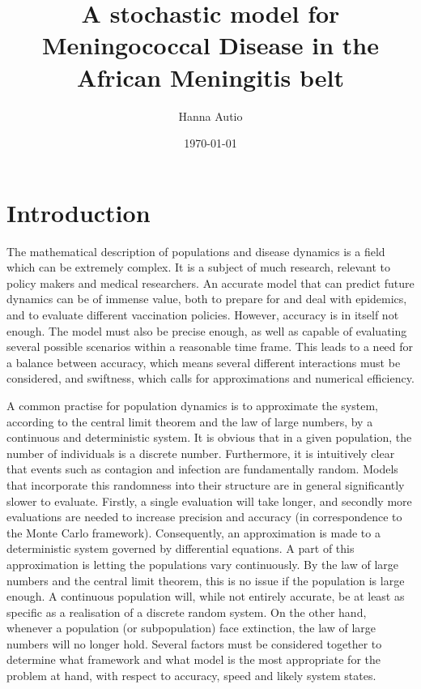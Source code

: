 \documentclass[10pt,a4paper]{article}
\author{Hanna Autio}
\title{A stochastic model for Meningococcal Disease in the African Meningitis belt} %
\date{\today}
\begin{document}
\maketitle
\thispagestyle{empty}
\cleardoublepage
\newpage
\setcounter{page}{1}



\section{Introduction}

The mathematical description of populations and disease dynamics is a field which can be extremely complex. It is a subject of much research, relevant to policy makers and medical researchers. An accurate model that can predict future dynamics can be of immense value, both to prepare for and deal with epidemics, and to evaluate different vaccination policies. However, accuracy is in itself not enough. The model must also be precise enough, as well as capable of evaluating several possible scenarios within a reasonable time frame. This leads to a need for a balance between accuracy, which means several different interactions must be considered, and swiftness, which calls for approximations and numerical efficiency.

A common practise for population dynamics is to approximate the system, according to the central limit theorem and the law of large numbers, by a continuous and deterministic system. It is obvious that in a given population, the number of individuals is a discrete number. Furthermore, it is intuitively clear that events such as contagion and infection are fundamentally random. Models that incorporate this randomness into their structure are in general significantly slower to evaluate. Firstly, a single evaluation will take longer, and secondly more evaluations are needed to increase precision and accuracy (in correspondence to the Monte Carlo framework). Consequently, an approximation is made to a deterministic system governed by differential equations. A part of this approximation is letting the populations vary continuously. By the law of large numbers and the central limit theorem, this is no issue if the population is large enough. A continuous population will, while not entirely accurate, be at least as specific as a realisation of a discrete random system. On the other hand, whenever a population (or subpopulation) face extinction, the law of large numbers will no longer hold. Several factors must be considered together to determine what framework and what model is the most appropriate for the problem at hand, with respect to accuracy, speed and likely system states.
\end{document}

